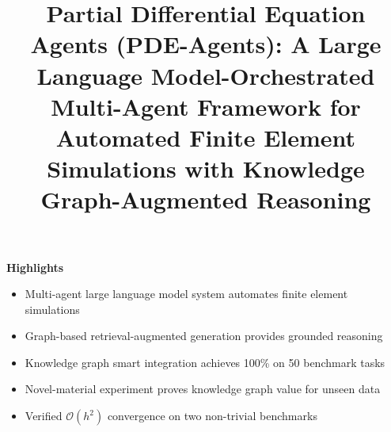 \documentclass[12pt]{elsarticle}
\begin{document}
\begin{frontmatter}

\title{Partial Differential Equation Agents (PDE-Agents):
       A Large Language Model-Orchestrated Multi-Agent
       Framework for Automated Finite Element Simulations
       with Knowledge Graph-Augmented Reasoning}

\end{frontmatter}

\noindent\textbf{Highlights}

\begin{itemize}
\item Multi-agent large language model system automates finite element simulations
\item Graph-based retrieval-augmented generation provides grounded reasoning
\item Knowledge graph smart integration achieves 100\% on 50 benchmark tasks
\item Novel-material experiment proves knowledge graph value for unseen data
\item Verified $\mathcal{O}(h^2)$ convergence on two non-trivial benchmarks
\end{itemize}
\end{document}
